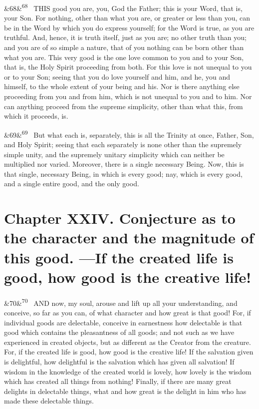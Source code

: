 \documentclass[12pt]{article}
\newcommand{\para}[1][]{\par\noindent\ifx&#1&\else\textsuperscript{\footnotesize #1}~\fi}
\begin{document}
\para[68] THIS good you are, you, God the Father; this is your Word, that is, your Son. For nothing, other than what you are, or greater or less than you, can be in the Word by which you do express yourself; for the Word is true, as you are truthful. And, hence, it is truth itself, just as you are; no other truth than you; and you are of so simple a nature, that of you nothing can be born other than what you are. This very good is the one love common to you and to your Son, that is, the Holy Spirit proceeding from both. For this love is not unequal to you or to your Son; seeing that you do love yourself and him, and he, you and himself, to the whole extent of your being and his. Nor is there anything else proceeding from you and from him, which is not unequal to you and to him. Nor can anything proceed from the supreme simplicity, other than what this, from which it proceeds, is.

\para[69] But what each is, separately, this is all the Trinity at once, Father, Son, and Holy Spirit; seeing that each separately is none other than the supremely simple unity, and the supremely unitary simplicity which can neither be multiplied nor varied. Moreover, there is a single necessary Being. Now, this is that single, necessary Being, in which is every good; nay, which is every good, and a single entire good, and the only good.


\section*{Chapter XXIV. Conjecture as to the character and the magnitude of this good. ---If the created life is good, how good is the creative life!}

\para[70] AND now, my soul, arouse and lift up all your understanding, and conceive, so far as you can, of what character and how great is that good! For, if individual goods are delectable, conceive in earnestness how delectable is that good which contains the pleasantness of all goods; and not such as we have experienced in created objects, but as different as the Creator from the creature. For, if the created life is good, how good is the creative life! If the salvation given is delightful, how delightful is the salvation which has given all salvation! If wisdom in the knowledge of the created world is lovely, how lovely is the wisdom which has created all things from nothing! Finally, if there are many great delights in delectable things, what and how great is the delight in him who has made these delectable things.
\end{document}
